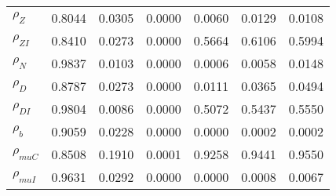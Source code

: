 \begin{center}
\begin{longtable}{lcccccc}
$ {\rho_Z}             $	 & 	          0.8044	 & 	          0.0305	 & 	          0.0000	 & 	          0.0060	 & 	          0.0129	 & 	          0.0108 \\ 
$ {\rho_{ZI}}          $	 & 	          0.8410	 & 	          0.0273	 & 	          0.0000	 & 	          0.5664	 & 	          0.6106	 & 	          0.5994 \\ 
$ {\rho_N}             $	 & 	          0.9837	 & 	          0.0103	 & 	          0.0000	 & 	          0.0006	 & 	          0.0058	 & 	          0.0148 \\ 
$ {\rho_D}             $	 & 	          0.8787	 & 	          0.0273	 & 	          0.0000	 & 	          0.0111	 & 	          0.0365	 & 	          0.0494 \\ 
$ {\rho_{DI}}          $	 & 	          0.9804	 & 	          0.0086	 & 	          0.0000	 & 	          0.5072	 & 	          0.5437	 & 	          0.5550 \\ 
$ {\rho_b}             $	 & 	          0.9059	 & 	          0.0228	 & 	          0.0000	 & 	          0.0000	 & 	          0.0002	 & 	          0.0002 \\ 
$ {\rho_{muC}}         $	 & 	          0.8508	 & 	          0.1910	 & 	          0.0001	 & 	          0.9258	 & 	          0.9441	 & 	          0.9550 \\ 
$ {\rho_{muI}}         $	 & 	          0.9631	 & 	          0.0292	 & 	          0.0000	 & 	          0.0000	 & 	          0.0008	 & 	          0.0067 \\ 
\end{longtable}
 \end{center}
